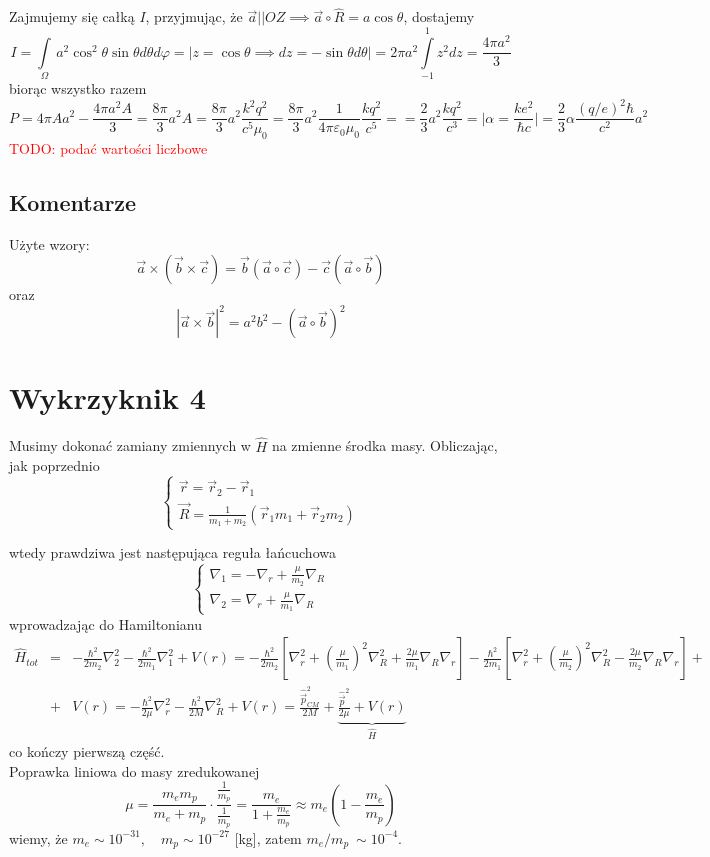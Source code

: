 \documentclass[a4paper,12pt]{article}
\newcommand\myworries[1]{\textcolor{red}{#1}} %
\begin{document}
	Zajmujemy się całką $I$, przyjmując, że $\vec{a} || OZ\implies \vec{a}\circ\hat{R} = a\cos\theta$, dostajemy
	$$
		I=\int\limits_\Omega\, a^2\cos^2\theta\sin\theta d\theta d\varphi = \bigg\vert z = \cos\theta\implies dz = -\sin\theta d\theta\bigg\vert = 2\pi a^2 \int\limits_{-1}^1 z^2 dz = \frac{4\pi a^2}{3}
	$$
	biorąc wszystko razem
	$$
	P = 4\pi A a^2 - \frac{4\pi a^2 A}{3} = \frac{8\pi}{3}a^2 A = \frac{8\pi}{3}a^2 \frac{k^2 q^2}{c^5 \mu_0} = \frac{8\pi}{3}a^2 \frac{1}{4\pi\varepsilon_0\mu_0}\frac{kq^2}{c^5} =
	= \frac{2}{3}a^2 \frac{kq^2}{c^3} = \bigg\vert \alpha = \frac{ke^2}{\hbar c}\bigg\vert = \frac{2}{3}\alpha\frac{(q/e)^2\hbar}{c^2}a^2
	$$
	\myworries{TODO: podać wartości liczbowe}
	\subsection{Komentarze}
		Użyte wzory:
		$$
		\vec{a}\times(\vec{b}\times\vec{c}) = \vec{b} (\vec{a}\circ\vec{c}) - \vec{c}(\vec{a}\circ\vec{b})
		$$
		oraz 
		$$
		|\vec{a} \times\vec{b}|^2 = a^2b^2 - (\vec{a}\circ\vec{b})^2
		$$

\section{Wykrzyknik 4}
		Musimy dokonać zamiany zmiennych w $\hat{H}$ na zmienne środka masy. Obliczając, jak poprzednio
		$$
		\left\{
			\begin{array}{l}
				\vec{r} = \vec{r}_2-\vec{r}_1\\
				\vec{R} = \frac{1}{m_1 + m_2}\left(\vec{r}_1 m_1 + \vec{r}_2 m_2\right)
			\end{array}
		\right.
	$$

		wtedy prawdziwa jest następująca reguła łańcuchowa 
		$$
		\left\{
			\begin{array}{l}
				\nabla_1 = -\nabla_r + \frac{\mu}{m_2}\nabla_R \\
				\nabla_2 = \nabla_r + \frac{\mu}{m_1}\nabla_R 
			\end{array}
		\right.
		$$
		wprowadzając do Hamiltonianu
		$$
		\begin{array}{lll}
			\hat{H}_{tot} &=& -\frac{\hbar^2}{2m_2}\nabla_2^2 - \frac{\hbar^2}{2m_1}\nabla_1^2 + V(r) = -\frac{\hbar^2}{2m_2}\left[\nabla_r^2+\left(\frac{\mu}{m_1}\right)^2\nabla_R^2
			+\frac{2\mu}{m_1}\nabla_R\nabla_r \right] -\frac{\hbar^2}{2m_1}\left[\nabla_r^2+\left(\frac{\mu}{m_2}\right)^2\nabla_R^2
			-\frac{2\mu}{m_2}\nabla_R\nabla_r \right] + \\
			&+& V(r) = -\frac{\hbar^2}{2\mu}\nabla_r^2-\frac{\hbar^2}{2M}\nabla_R^2 + V(r) = \frac{\hat{\vec{p}}_{CM}^2}{2M} + \underbrace{\frac{\hat{\vec{p}}^2}{2\mu} +  V(r)}_{\hat{H}}
		\end{array}
		$$
		co kończy pierwszą część.\\
		Poprawka liniowa do masy zredukowanej
		$$
			\mu = \frac{m_em_p}{m_e+m_p} \cdot \frac{\frac{1}{m_p}}{\frac{1}{m_p}} = \frac{m_e}{1+\frac{m_e}{m_p}} \approx m_e \left(1-\frac{m_e}{m_p}\right)
		$$
		wiemy, że $m_e \sim 10^{-31},\quad m_p \sim 10^{-27}$ [kg], zatem $m_e/m_p ~\sim 10^{-4}$.
\end{document}
